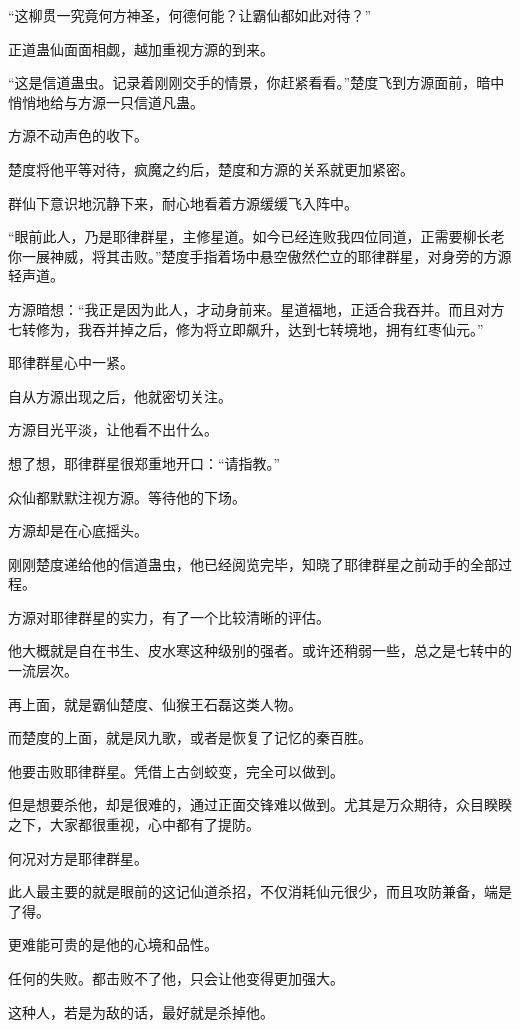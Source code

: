 \begin{this_body}
“这柳贯一究竟何方神圣，何德何能？让霸仙都如此对待？”

正道蛊仙面面相觑，越加重视方源的到来。

“这是信道蛊虫。记录着刚刚交手的情景，你赶紧看看。”楚度飞到方源面前，暗中悄悄地给与方源一只信道凡蛊。

方源不动声色的收下。

楚度将他平等对待，疯魔之约后，楚度和方源的关系就更加紧密。

群仙下意识地沉静下来，耐心地看着方源缓缓飞入阵中。

“眼前此人，乃是耶律群星，主修星道。如今已经连败我四位同道，正需要柳长老你一展神威，将其击败。”楚度手指着场中悬空傲然伫立的耶律群星，对身旁的方源轻声道。

方源暗想：“我正是因为此人，才动身前来。星道福地，正适合我吞并。而且对方七转修为，我吞并掉之后，修为将立即飙升，达到七转境地，拥有红枣仙元。”

耶律群星心中一紧。

自从方源出现之后，他就密切关注。

方源目光平淡，让他看不出什么。

想了想，耶律群星很郑重地开口：“请指教。”

众仙都默默注视方源。等待他的下场。

方源却是在心底摇头。

刚刚楚度递给他的信道蛊虫，他已经阅览完毕，知晓了耶律群星之前动手的全部过程。

方源对耶律群星的实力，有了一个比较清晰的评估。

他大概就是自在书生、皮水寒这种级别的强者。或许还稍弱一些，总之是七转中的一流层次。

再上面，就是霸仙楚度、仙猴王石磊这类人物。

而楚度的上面，就是凤九歌，或者是恢复了记忆的秦百胜。

他要击败耶律群星。凭借上古剑蛟变，完全可以做到。

但是想要杀他，却是很难的，通过正面交锋难以做到。尤其是万众期待，众目睽睽之下，大家都很重视，心中都有了提防。

何况对方是耶律群星。

此人最主要的就是眼前的这记仙道杀招，不仅消耗仙元很少，而且攻防兼备，端是了得。

更难能可贵的是他的心境和品性。

任何的失败。都击败不了他，只会让他变得更加强大。

这种人，若是为敌的话，最好就是杀掉他。


\end{this_body}
